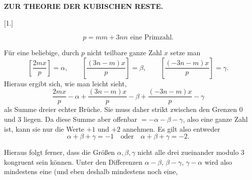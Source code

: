 \clearpage{}
\begin{center}
\bfseries ZUR THEORIE DER KUBISCHEN RESTE.
\end{center}



\begin{center}
[1.]
\end{center}

\[ p=mm+3nn \text{ eine Primzahl.} \]

\noindent\hspace*{\parindent}Für eine beliebige, durch $p$ nicht teilbare ganze Zahl $x$ setze man
\[
\left[\dfrac{2mx}{p}\right]=\alpha,\qquad \left[\dfrac{(3n-m)x}{p}\right]=\beta,\qquad \left[\dfrac{(-3n-m)x}{p}\right]=\gamma.
\]
\noindent Hieraus ergibt sich, wie man leicht sieht,
\[
\dfrac{2mx}{p}-\alpha+\dfrac{(3n-m)x}{p}-\beta+\dfrac{(-3n-m)x}{p}-\gamma
\]
als Summe dreier echter Brüche. Sie muss daher strikt zwischen den
Grenzen 0 und 3 liegen. Da diese Summe aber offenbar $=-\alpha-\beta-\gamma$, also
eine ganze Zahl ist, kann sie nur die Werte $+1$ und $+2$ annehmen.
Es gilt also entweder
\[ \alpha+\beta+\gamma=-1\quad\text{oder}\quad \alpha+\beta+\gamma=-2. \]

\noindent Hieraus folgt ferner, dass die Größen $\alpha, \beta, \gamma$ nicht alle drei zueinander
modulo 3 kongruent sein können. Unter den Differenzen $\alpha-\beta$, $\beta-\gamma$,
$\gamma-\alpha$ wird also mindestens eine (und eben deshalb mindestens noch eine,
